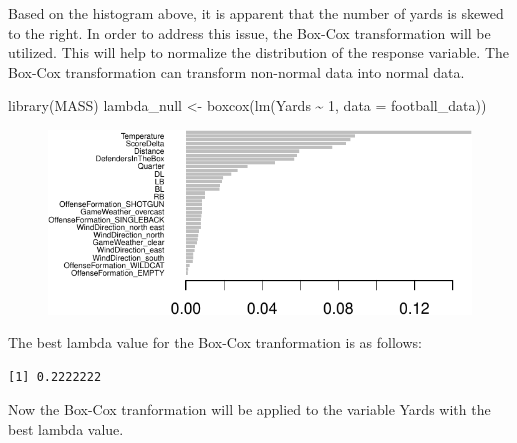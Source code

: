 \documentclass[
  super,
  preprint,
  3p]{elsarticle}
\newenvironment{Shaded}{\begin{snugshade}}{\end{snugshade}}
\newcommand{\AttributeTok}[1]{\textcolor[rgb]{0.40,0.45,0.13}{#1}}
\newcommand{\DecValTok}[1]{\textcolor[rgb]{0.68,0.00,0.00}{#1}}
\newcommand{\FunctionTok}[1]{\textcolor[rgb]{0.28,0.35,0.67}{#1}}
\newcommand{\NormalTok}[1]{\textcolor[rgb]{0.00,0.23,0.31}{#1}}
\newcommand{\OtherTok}[1]{\textcolor[rgb]{0.00,0.23,0.31}{#1}}
\newcommand{\SpecialCharTok}[1]{\textcolor[rgb]{0.37,0.37,0.37}{#1}}
\begin{document}
Based on the histogram above, it is apparent that the number of yards is
skewed to the right. In order to address this issue, the Box-Cox
transformation will be utilized. This will help to normalize the
distribution of the response variable. The Box-Cox transformation can
transform non-normal data into normal data.

\begin{Shaded}
\begin{Highlighting}[]
\FunctionTok{library}\NormalTok{(MASS)}
\NormalTok{lambda\_null }\OtherTok{\textless{}{-}} \FunctionTok{boxcox}\NormalTok{(}\FunctionTok{lm}\NormalTok{(Yards }\SpecialCharTok{\textasciitilde{}} \DecValTok{1}\NormalTok{, }\AttributeTok{data =}\NormalTok{ football\_data))}
\end{Highlighting}
\end{Shaded}

\begin{figure}[H]

{\centering \includegraphics{project_report_files/figure-pdf/unnamed-chunk-20-1.pdf}

}

\end{figure}

The best lambda value for the Box-Cox tranformation is as follows:

\begin{Shaded}
\end{Shaded}

\begin{verbatim}
[1] 0.2222222
\end{verbatim}

Now the Box-Cox tranformation will be applied to the variable Yards with
the best lambda value.
\end{document}
